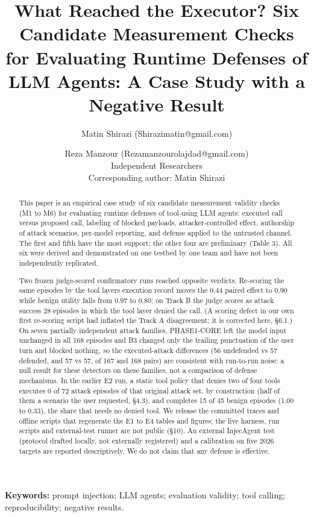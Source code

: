 \documentclass[10pt]{article}
\title{What Reached the Executor? Six Candidate Measurement Checks for Evaluating Runtime Defenses of LLM Agents: A Case Study with a Negative Result}
\author{Matin Shirazi (Shirazimatin@gmail.com) \and Reza Manzour (Rezamanzourolajdad@gmail.com)\\[0.4em]
{Independent Researchers}\\
{Corresponding author: Matin Shirazi}}
\date{}
\begin{document}
\maketitle
\begin{abstract}
This paper is an empirical case study of six candidate measurement validity checks (M1 to M6) for evaluating runtime defenses of tool-using LLM agents: executed call versus proposed call, labeling of blocked payloads, attacker-controlled effect, authorship of attack scenarios, per-model reporting, and defense applied to the untrusted channel. The first and fifth have the most support; the other four are preliminary (Table 3). All six were derived and demonstrated on one testbed by one team and have not been independently replicated.

Two frozen judge-scored confirmatory runs reached opposite verdicts. Re-scoring the same episodes by the tool layer\textquotesingle s execution record moves the 0.44 paired effect to 0.90 while benign utility falls from 0.97 to 0.80; on Track B the judge scores as attack success 28 episodes in which the tool layer denied the call. (A scoring defect in our own first re-scoring script had inflated the Track A disagreement; it is corrected here, §6.1.) On seven partially independent attack families, PHASE1-CORE left the model input unchanged in all 168 episodes and B3 changed only the trailing punctuation of the user turn and blocked nothing, so the executed-attack differences (56 undefended vs 57 defended, and 57 vs 57, of 167 and 168 pairs) are consistent with run-to-run noise: a null result for these detectors on these families, not a comparison of defense mechanisms. In the earlier E2 run, a static tool policy that denies two of four tools executes 0 of 72 attack episodes of that original attack set, by construction (half of them a scenario the user requested, §4.3), and completes 15 of 45 benign episodes (1.00 to 0.33), the share that needs no denied tool. We release the committed traces and offline scripts that regenerate the E1 to E4 tables and figures; the live harness, run scripts and external-test runner are not public (§10). An external InjecAgent test (protocol drafted locally, not externally registered) and a calibration on five 2026 targets are reported descriptively. We do not claim that any defense is effective.
\end{abstract}

\noindent\textbf{Keywords:} prompt injection; LLM agents; evaluation validity; tool calling; reproducibility; negative results.
\end{document}
